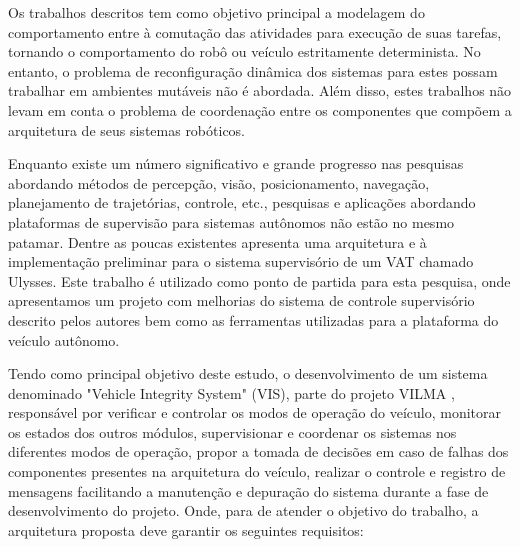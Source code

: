 \documentclass[conference]{IEEEtran}
\begin{document}
Os trabalhos descritos tem como objetivo principal a modelagem do comportamento entre à comutação das atividades para execução de suas tarefas, tornando o comportamento do robô ou veículo estritamente determinista. No entanto, o problema de reconfiguração dinâmica dos sistemas para estes possam trabalhar em ambientes mutáveis não é abordada. Além disso, estes trabalhos não levam em conta o problema de coordenação entre os componentes que compõem a arquitetura de seus sistemas robóticos.

Enquanto existe um número significativo e grande progresso nas pesquisas abordando métodos de percepção, visão, posicionamento, navegação, planejamento de trajetórias, controle, etc., pesquisas e aplicações abordando plataformas de supervisão para sistemas autônomos não estão no mesmo patamar. Dentre as poucas existentes \cite{event_supervisory_land_1157827} apresenta uma arquitetura e à implementação preliminar para o sistema supervisório de um VAT chamado Ulysses. Este trabalho é utilizado como ponto de partida para esta pesquisa, onde apresentamos um projeto com melhorias do sistema de controle supervisório descrito pelos autores bem como as ferramentas utilizadas para a plataforma do veículo autônomo. 


Tendo como principal objetivo deste estudo, o desenvolvimento de um sistema denominado "Vehicle Integrity System" (VIS), parte do projeto VILMA \cite{lma_vilma_website}, responsável por verificar e controlar os modos de operação do veículo, monitorar os estados dos outros módulos, supervisionar e coordenar os sistemas nos diferentes modos de operação, propor a tomada de decisões em caso de falhas dos componentes presentes na arquitetura do veículo, realizar o controle e registro de mensagens facilitando a manutenção e depuração do sistema durante a fase de desenvolvimento do projeto. Onde, para de atender o objetivo do trabalho, a arquitetura proposta deve garantir os seguintes requisitos:
\end{document}
